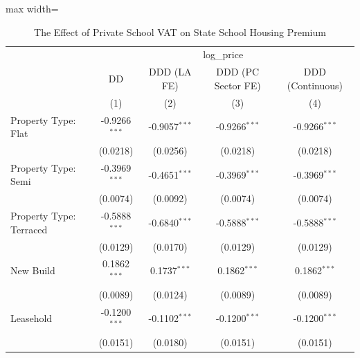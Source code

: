
\begin{table}[htbp]
   \caption{\label{tab:main} The Effect of Private School VAT on State School Housing Premium}
   \bigskip
   \centering
   \begin{adjustbox}{max width=\textwidth}
   \begin{tabular}{lcccc}
      \toprule
       & \multicolumn{4}{c}{log\_price}\\
                                                                          & DD              & DDD (LA FE)     & DDD (PC Sector FE) & DDD (Continuous) \\   
                                                                          & (1)             & (2)             & (3)                & (4)\\  
      \midrule 
      Property Type: Flat                                                  & -0.9266$^{***}$ & -0.9057$^{***}$ & -0.9266$^{***}$    & -0.9266$^{***}$\\
                                                                          & (0.0218)        & (0.0256)        & (0.0218)           & (0.0218)\\
      Property Type: Semi                                                 & -0.3969$^{***}$ & -0.4651$^{***}$ & -0.3969$^{***}$    & -0.3969$^{***}$\\
                                                                          & (0.0074)        & (0.0092)        & (0.0074)           & (0.0074)\\
      Property Type: Terraced                                             & -0.5888$^{***}$ & -0.6840$^{***}$ & -0.5888$^{***}$    & -0.5888$^{***}$\\
                                                                          & (0.0129)        & (0.0170)        & (0.0129)           & (0.0129)\\
      New Build                                                           & 0.1862$^{***}$  & 0.1737$^{***}$  & 0.1862$^{***}$     & 0.1862$^{***}$\\
                                                                          & (0.0089)        & (0.0124)        & (0.0089)           & (0.0089)\\
      Leasehold                                                           & -0.1200$^{***}$ & -0.1102$^{***}$ & -0.1200$^{***}$    & -0.1200$^{***}$\\
                                                                          & (0.0151)        & (0.0180)        & (0.0151)           & (0.0151)\\   

\end{tabular}
\end{adjustbox}
\end{table}
